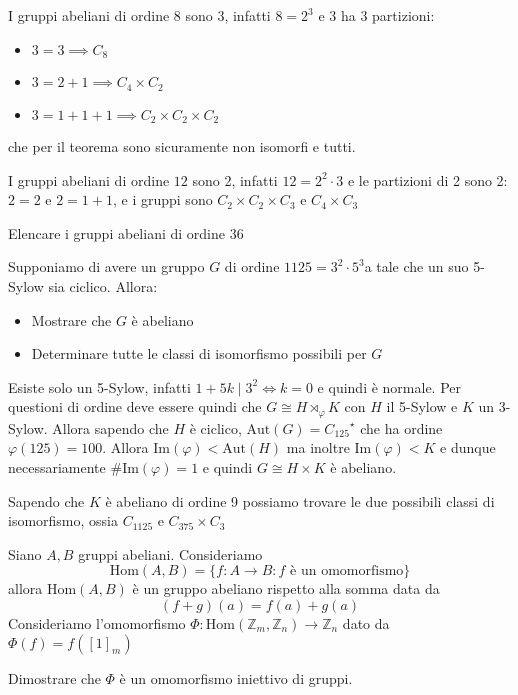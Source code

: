 \begin{example}
    I gruppi abeliani di ordine \(8\) sono \(3\), infatti \(8 = 2^{3}\) e \(3\)
    ha 3 partizioni:
\begin{itemize}[label = --]
    \item \(3 = 3 \implies C_8\)
    \item \(3 = 2+1 \implies C_4 \times C_2 \)
    \item \(3 = 1 + 1 + 1 \implies C_{2} \times C_{2} \times C_{2}\) 
\end{itemize}
che per il teorema sono sicuramente non isomorfi e tutti.
\end{example}
\begin{example}
    I gruppi abeliani di ordine \(12\) sono 2, infatti \(12 = 2^{2}\cdot 3\) e
    le partizioni di 2 sono 2: \(2 = 2\) e \(2 = 1 + 1\), e i gruppi sono
    \(C_{2}\times C_{2}\times C_{3}\) e \(C_{4} \times C_{3}\) 
\end{example}
\begin{eser}
    Elencare i gruppi abeliani di ordine 36
\end{eser}

\begin{eser}
    Supponiamo di avere un gruppo \(G\) di ordine \(1125 = 3^2 \cdot
    5^3\)a tale che un suo 5-Sylow sia ciclico. Allora:
\begin{itemize}[label = --]
    \item Mostrare che \(G\) è abeliano
    \item Determinare tutte le classi di isomorfismo possibili per \(G\)  
\end{itemize}
\tcblower
Esiste solo un 5-Sylow, infatti \(1+5k \mid 3^2 \iff k = 0\) e quindi è normale.
Per questioni di ordine deve essere quindi che \(G \cong H \rtimes_\varphi  K\) con
\(H\) il 5-Sylow e \(K\) un 3-Sylow.
Allora sapendo che \(H\) è ciclico, \(\mathrm{Aut}{(G)} = {C_{125}}^{\star}\)
che ha ordine \(\varphi{(125)} = 100\). Allora \(\mathrm{Im}{(\varphi)} <
\mathrm{Aut}{(H)}\) ma inoltre \(\mathrm{Im}{(\varphi )}< K\) e dunque
necessariamente \(\# \mathrm{Im}{(\varphi )} = 1\) e quindi \(G \cong H \times
K\) è abeliano.

Sapendo che \(K\) è abeliano di ordine 9 possiamo trovare le due possibili
classi di isomorfismo, ossia \(C_{1125} \) e \(C_{375} \times C_{3}\)
\end{eser}

\begin{eser}
    Siano \(A, B\) gruppi abeliani. Consideriamo 
    \[
        \mathrm{Hom}{(A, B)} = \{f : A \to B : f \text{ è un omomorfismo}\}
    \]
    allora \(\mathrm{Hom}{(A, B)}\) è un gruppo abeliano rispetto alla somma
    data da
    \[
      {(f + g)}(a) = f(a) + g(a)
    \]
    Consideriamo l'omomorfismo \(\Phi : \mathrm{Hom}{(\mathbb{Z}_m,
    \mathbb{Z}_n)} \to \mathbb{Z}_n \) dato da \(\Phi{(f)} = f{([1]_m)}\) 

    Dimostrare che \(\Phi\) è un omomorfismo iniettivo di gruppi.

    \tcbline

    \tcbline
\end{eser}



